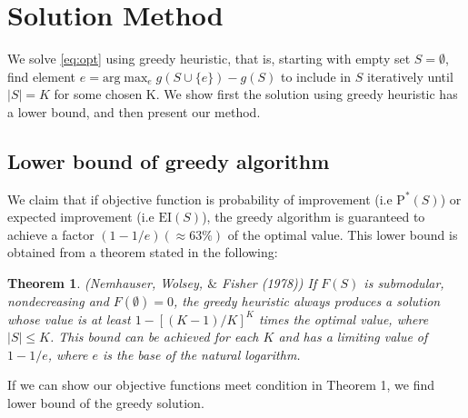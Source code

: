 \documentclass[11pt]{article}
\newcommand{\E}{\mathbb{E}}
\newcommand{\EI}{\mathrm{EI}}
\newcommand{\PI}{\text{P}^*}
\newtheorem{thm}{Theorem}
\begin{document}
\section{Solution Method}
We solve \eqref{eq:opt} using greedy heuristic, that is, starting with empty set $S=\emptyset$, find element $e = \mathrm{arg}\max_e g(S \cup \{e\})-g(S)$ to include in $S$ iteratively until $|S|=K$ for some chosen K. We show first the solution using greedy heuristic has a lower bound, and then present our method.
\subsection{Lower bound of greedy algorithm}
We claim that if objective function is probability of improvement (i.e $\PI(S)$) or expected improvement (i.e $\EI(S)$), the greedy algorithm is guaranteed to achieve a factor $(1-1/e) (\approx 63\%)$ of the optimal value. This lower bound is obtained from a theorem stated in the following:

\begin{thm} (Nemhauser, Wolsey, $\&$ Fisher (1978))
If $F(S)$ is submodular, nondecreasing and $F(\emptyset)=0$, the greedy heuristic always produces a solution whose value is at least $1-[(K-1)/K]^K$ times the optimal value, where $|S| \leq K$. This bound can be achieved for each $K$ and has a limiting value of $1-1/e$, where $e$ is the base of the natural logarithm.
\end{thm}

If we can show our objective functions meet condition in Theorem 1, we find lower bound of the greedy solution.
\end{document}
